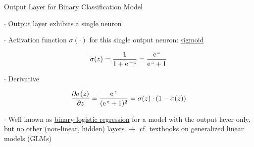 \documentclass[mathserif, aspectratio=1610]{intbeamer}
\begin{document}
\begin{frame}[t]{Output Layer for Binary Classification Model}

$\cdot$ Output layer exhibits a single neuron

$\cdot$ Activation function $\sigma(\cdot)$ for this single output neuron: \underline{sigmoid}

$$\sigma(z) = \frac{1}{1+\e^{-z}} = \frac{\e^{z}}{\e^{z}+1}$$

\begin{center}
\end{center}

$\cdot$ Derivative

$$\frac{\partial \sigma(z)}{\partial z} = \frac{\e^{z}}{(\e^{z}+1)^2} = \sigma(z) \cdot (1-\sigma(z))$$

$\cdot$ Well known as \underline{binary logistic regression} for a model with the output layer only, but no other (non-linear, hidden) layers $\rightarrow$ cf. textbooks on generalized linear models (GLMs)

\end{frame}
\end{document}
